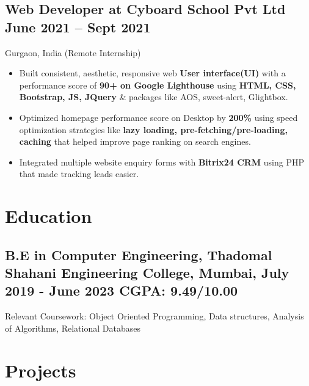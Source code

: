 \documentclass[a4,10pt]{article}
\newcommand{\subtext}[1]{
#1\par\vspace{-0.2cm}}
\newenvironment{zitemize}{
\begin{itemize}\itemsep0pt \parskip0pt \parsep1pt}
{\end{itemize}\vspace{-0.5cm}}
\begin{document}
\subsection*{Web Developer at Cyboard School Pvt Ltd \hfill June 2021 -- Sept 2021} 
\subtext{Gurgaon, India {\normalsize\normalfont (Remote Internship) }}
    \begin{zitemize}
        \item Built consistent, aesthetic, responsive web \textbf{User interface(UI)} with a performance score of \textbf{90+ on Google Lighthouse}
        using \textbf{HTML, CSS, Bootstrap, JS, JQuery} \& packages like AOS, sweet-alert, Glightbox. 
        \item Optimized homepage performance score on Desktop by \textbf{200\%} using speed optimization strategies like \textbf{lazy loading, pre-fetching/pre-loading, caching} that helped improve page ranking on search engines.
        \item Integrated multiple website enquiry forms with \textbf{Bitrix24 CRM} using PHP that made tracking leads easier.
    \end{zitemize}




\section{Education }
\subsection*{B.E in Computer Engineering, {\normalsize \normalfont Thadomal Shahani Engineering College, Mumbai, July 2019 - June 2023} \hfill CGPA: 9.49/10.00} 
\subtext{{Relevant Coursework: Object Oriented Programming, Data structures, Analysis of Algorithms, Relational Databases} }


\section{Projects} %
\end{document}

